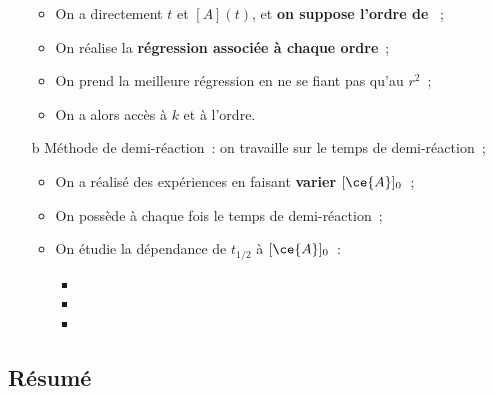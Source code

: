 \documentclass[../../main/main.tex]{subfiles}
\begin{document}
\begin{tcb*}[breakable]
\begin{itemize}
		      \begin{itemize}
			      \item On a directement $t$ et $[A](t)$, et \textbf{on suppose
				            l'ordre de
				            }~;
			      \item On réalise la \textbf{régression associée à chaque ordre}~;
			      \item On prend la meilleure régression en ne se fiant pas qu'au
			            $r^2$~;
			      \item On a alors accès à $k$ et à l'ordre.
		      \end{itemize}
		\item[b]{Méthode de demi-réaction}~: on travaille sur le temps de
		      demi-réaction~;
		      \begin{itemize}
			      \item On a réalisé des expériences en faisant \textbf{varier
				            $[\ce{A}]_0$}~;
			      \item On possède à chaque fois le temps de demi-réaction~;
			      \item On étudie la dépendance de $t_{1/2}$ à $[\ce{A}]_0$~:
			            \begin{itemize}
				            \item {}%
				            \item {}%
				            \item {}%
			            \end{itemize}
		      \end{itemize}
	\end{itemize}
\end{tcb*}

\subsection{Résumé}
\end{document}
